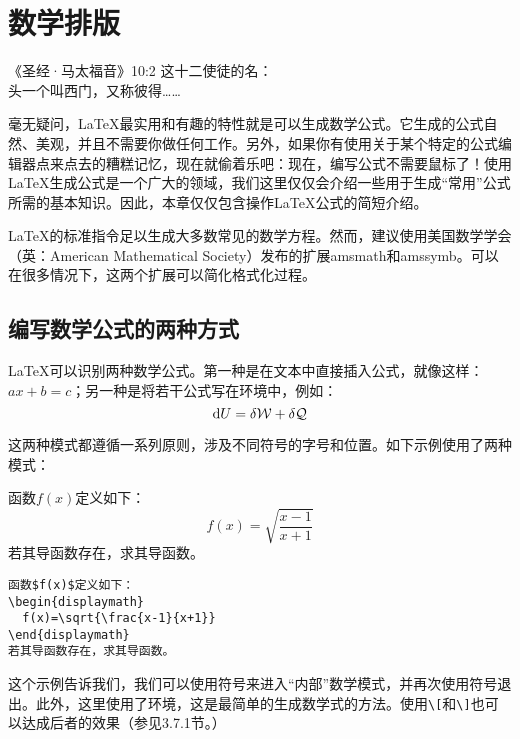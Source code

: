 \chapter{数学排版}

\begin{epigraphe}{《圣经·马太福音》10:2}
  这十二使徒的名：\\头一个叫西门，又称彼得……
\end{epigraphe}

毫无疑问，\LaTeX 最实用和有趣的特性就是可以生成数学公式。它生成的公式自然、美观，并且不需要你做任何工作。另外，如果你有使用关于某个特定的公式编辑器点来点去的糟糕记忆，现在就偷着乐吧：现在，编写公式不需要鼠标了！使用\LaTeX 生成公式是一个广大的领域，我们这里仅仅会介绍一些用于生成“常用”公式所需的基本知识。因此，本章仅仅包含操作\LaTeX 公式的简短介绍。

\begin{ii}
\LaTeX 的标准指令足以生成大多数常见的数学方程。然而，建议使用美国数学学会（英：American Mathematical Society）发布的扩展amsmath和amssymb。可以在很多情况下，这两个扩展可以简化格式化过程。
\end{ii}

\section{编写数学公式的两种方式}

\LaTeX 可以识别两种数学公式。第一种是在文本中直接插入公式，就像这样：$ax+b=c$；另一种是将若干公式写在环境中，例如：
$$
{\rm d} U = \delta \mathcal{W} +\delta \mathcal{Q} 
$$

这两种模式都遵循一系列原则，涉及不同符号的字号和位置。如下示例使用了两种模式：

\begin{codelist}[3.1]{
  函数$f(x)$定义如下：
\begin{displaymath}
  f(x)=\sqrt{\frac{x-1}{x+1}}
\end{displaymath}
若其导函数存在，求其导函数。
}
\begin{verbatim}
函数$f(x)$定义如下：
\begin{displaymath}
  f(x)=\sqrt{\frac{x-1}{x+1}}
\end{displaymath}
若其导函数存在，求其导函数。\end{verbatim}
\end{codelist}

这个示例告诉我们，我们可以使用\dm{\$}符号来进入“内部”数学模式，并再次使用\dm{\$}符号退出。此外，这里使用了环境，这是最简单的生成数学式的方法。使用\verb|\[|和\verb|\]|也可以达成后者的效果（参见3.7.1节。）


